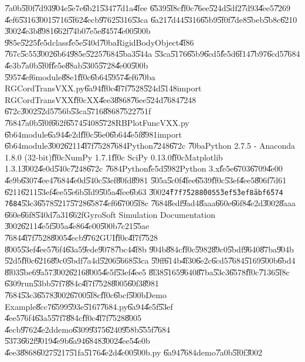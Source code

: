 \documentclass[12pt,a4paper]{article}
\begin{document}
\U{7a0b}\U{5f0f}\U{7d93}\U{904e}\U{5e7e}\U{6b21}\U{5347}\U{7d1a}\U{4fee}%
\U{6539}\U{5f8c}\U{ff0c}\U{76ee}\U{524d}\U{5df2}\U{7d93}\U{4ee5}\U{7269}%
\U{4ef6}\U{5316}\U{3001}\U{5716}\U{5f62}\U{4ecb}\U{9762}\U{5316}\U{53ca}%
\U{6a21}\U{7d44}\U{5316}\U{65b9}\U{5f0f}\U{7de8}\U{5beb}\U{5b8c}\U{6210}%
\U{3002}\U{4e3b}\U{8981}\U{662f}\U{74b0}\U{7e5e}\U{8457}\U{4e00}\U{500b}%
\U{985e}\U{5225}\U{fe5d}class\U{fe5e}\U{540d}\U{70ba}RigidBodyObject\U{4f86}%
\U{767c}\U{5c55}\U{3002}\U{6b64}\U{985e}\U{5225}\U{7684}\U{5ba3}\U{544a}%
\U{53ca}\U{5176}\U{65b9}\U{6cd5}\U{fe5d}\U{6f14}\U{7b97}\U{6cd5}\U{7684}%
\U{4e3b}\U{7a0b}\U{5f0f}\U{fe5e}\U{88ab}\U{5305}\U{5728}\U{4e00}\U{500b}%
\U{5957}\U{4ef6}module\U{88e1}\U{ff0c}\U{6b64}\U{5957}\U{4ef6}\U{70ba}%
RGCordTransVXX.py\U{6a94}\U{ff0c}\U{4f7f}\U{7528}\U{524d}\U{5148}import
RGCordTransVXX\U{ff0c}XX\U{4ee3}\U{8868}\U{76ee}\U{524d}\U{7684}\U{7248}%
\U{672c}\U{3002}\U{52d5}\U{756b}\U{53ca}\U{5716}\U{8868}\U{7522}\U{751f}%
\U{7684}\U{7a0b}\U{5f0f}\U{662f}\U{6574}\U{5408}\U{5728}RBPlotFuncVXX.py%
\U{6b64}module\U{6a94}\U{4e2d}\U{ff0c}\U{56e0}\U{6b64}\U{4e5f}\U{8981}import%
\U{6b64}module\U{3002}\U{6211}\U{4f7f}\U{7528}\U{7684}Python\U{7248}\U{672c}%
\U{70ba}Python 2.7.5 - Anaconda 1.8.0 (32-bit)\U{ff0c}NumPy 1.7.1\U{ff0c}%
SciPy 0.13.0\U{ff0c}Matplotlib 1.3.1\U{3002}\U{4e0d}\U{540c}\U{7248}\U{672c}%
\U{7684}Python\U{fe5d}\U{5982}Python 3.x\U{fe5e}\U{6703}\U{6709}\U{4e00}%
\U{4e9b}\U{6307}\U{4ee4}\U{7684}\U{4e0d}\U{540c}\U{53ef}\U{80fd}\U{8981}%
\U{505a}\U{5c0f}\U{4fee}\U{6539}\U{ff0c}\U{53ef}\U{4ee5}\U{806f}\U{7d61}%
\U{6211}\U{6211}\U{53ef}\U{4ee5}\U{5e6b}\U{5fd9}\U{505a}\U{4fee}\U{6b63}%
\U{3002}\texttt{\U{4f7f}\U{7528}\U{8005}\U{53ef}\U{53ef}\U{8abf}\U{6574}%
\U{7684}}\U{53c3}\U{6578}\U{5217}\U{5728}\U{6587}\U{4ef6}\U{6700}\U{5f8c}%
\U{7684}\U{8edf}\U{9ad4}\U{8aaa}\U{660e}\U{66f8}\U{4e2d}\U{3002}\U{8aaa}%
\U{660e}\U{66f8}\U{540d}\U{7a31}\U{662f}GyroSoft Simulation Documentation%
\U{3002}\U{6211}\U{4e5f}\U{505a}\U{4e86}\U{4e00}\U{500b}\U{7c21}\U{55ae}%
\U{7684}\U{4f7f}\U{7528}\U{8005}\U{4ecb}\U{9762}GUI\U{ff0c}\U{4f7f}\U{7528}%
\U{8005}\U{53ef}\U{4ee5}\U{76f4}\U{63a5}\U{9ede}\U{9078}\U{7bc4}\U{4f8b}%
\U{904b}\U{884c}\U{ff0c}\U{5982}\U{89c0}\U{5bdf}\U{9640}\U{87ba}\U{904b}%
\U{52d5}\U{ff0c}\U{6216}\U{89c0}\U{5bdf}\U{7a4d}\U{5206}\U{5668}\U{53ca}%
\U{59ff}\U{614b}\U{4f30}\U{6e2c}\U{6cd5}\U{7684}\U{5169}\U{500b}\U{6bd4}%
\U{8f03}\U{5be6}\U{9a57}\U{3002}\U{6216}\U{8005}\U{4e5f}\U{53ef}\U{4ee5}%
\U{8f38}\U{5165}\U{9640}\U{87ba}\U{53c3}\U{6578}\U{ff0c}\U{7136}\U{5f8c}%
\U{6309}run\U{53bb}\U{57f7}\U{884c}\U{4f7f}\U{7528}\U{8005}\U{60f3}\U{8981}%
\U{7684}\U{53c3}\U{6578}\U{3002}\U{6700}\U{5f8c}\U{ff0c}\U{6bcf}\U{500b}Demo
Example\U{8cc7}\U{6599}\U{593e}\U{5167}\U{7684}.py\U{6a94}\U{4e5f}\U{53ef}%
\U{4ee5}\U{76f4}\U{63a5}\U{57f7}\U{884c}\U{ff0c}\U{4f7f}\U{7528}\U{8005}%
\U{4ecb}\U{9762}\U{4e2d}demo\U{6309}\U{9375}\U{6240}\U{958b}\U{555f}\U{7684}%
\U{5373}\U{662f}\U{9019}\U{4e9b}\U{6a94}\U{6848}\U{3002}\U{4ee5}\U{4e0b}%
\U{4ee3}\U{8868}\U{6027}\U{5217}\U{51fa}\U{5176}\U{4e2d}\U{4e00}\U{500b}.py%
\U{6a94}\U{7684}demo\U{7a0b}\U{5f0f}\U{3002}
\end{document}
